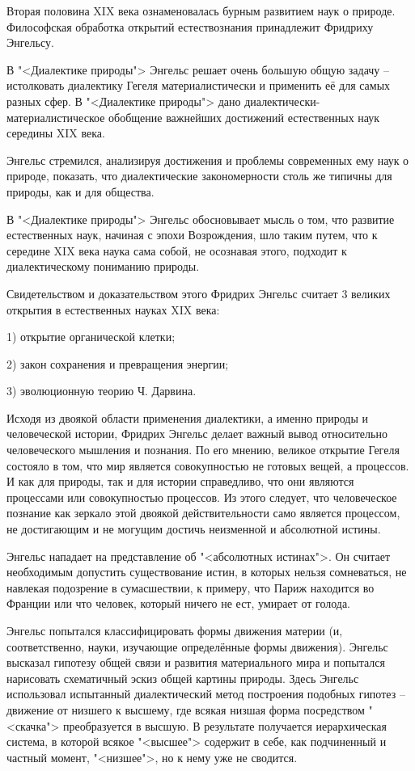 \documentclass[exam_answers.tex]{subfiles}
\begin{document}
\renewcommand{\baselinestretch}{\blch}

Вторая половина XIX века ознаменовалась бурным развитием наук о природе.
Философская обработка открытий естествознания принадлежит Фридриху Энгельсу.

В "<Диалектике природы"> Энгельс решает очень большую общую задачу -- истолковать диалектику Гегеля материалистически и применить её для самых разных сфер.
В "<Диалектике природы"> дано диалектически-материалистическое обобщение важнейших достижений естественных наук середины XIX века.

Энгельс стремился, анализируя достижения и проблемы современных ему наук о природе, показать, что диалектические закономерности столь же типичны для природы, как и для общества.

В "<Диалектике природы"> Энгельс обосновывает мысль о том, что развитие естественных наук, начиная с эпохи Возрождения, шло таким путем, что к середине XIX века наука сама собой, не осознавая этого, подходит к диалектическому пониманию природы.

Свидетельством и доказательством этого Фридрих Энгельс считает 3 великих открытия в естественных науках XIX века:

1) открытие органической клетки;

2) закон сохранения и превращения энергии;

3) эволюционную теорию Ч. Дарвина.

Исходя из двоякой области применения диалектики, а именно природы и человеческой истории, Фридрих Энгельс делает важный вывод относительно человеческого мышления и познания.
По его мнению, великое открытие Гегеля состояло в том, что мир является совокупностью не готовых вещей, а процессов.
И как для природы, так и для истории справедливо, что они являются процессами или совокупностью процессов.
Из этого следует, что человеческое познание как зеркало этой двоякой действительности само является процессом, не достигающим и не могущим достичь неизменной и абсолютной истины.

Энгельс нападает на представление об "<абсолютных истинах">.
Он считает необходимым допустить существование истин, в которых нельзя сомневаться, не навлекая подозрение в сумасшествии, к примеру, что Париж находится во Франции или что человек, который ничего не ест, умирает от голода.

Энгельс попытался классифицировать формы движения материи (и, соответственно, науки, изучающие определённые формы движения).
Энгельс высказал гипотезу общей связи и развития материального мира и попытался нарисовать схематичный эскиз общей картины природы.
Здесь Энгельс использовал испытанный диалектический метод построения подобных гипотез -- движение от низшего к высшему, где всякая низшая форма посредством "<скачка"> преобразуется в высшую.
В результате получается иерархическая система, в которой всякое "<высшее"> содержит в себе, как подчиненный и частный момент, "<низшее">, но к нему уже не сводится.
\end{document}
